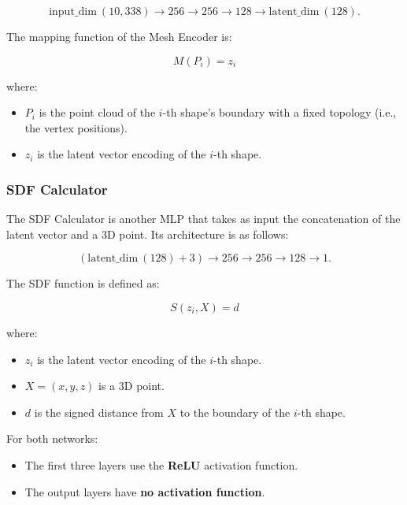 \documentclass[a4paper,12pt]{article}
\begin{document}
\[
	\text{input\_dim} \ (10,338) \rightarrow 256 \rightarrow 256 \rightarrow 128 \rightarrow \text{latent\_dim} \ (128).
\]

The mapping function of the Mesh Encoder is:

\[
	M(P_i) = z_i
\]

where:
\begin{itemize}
	\item \( P_i \) is the point cloud of the \( i \)-th shape's boundary with a fixed topology (i.e., the vertex positions).
	\item \( z_i \) is the latent vector encoding of the \( i \)-th shape.
\end{itemize}

\subsubsection*{SDF Calculator}
The SDF Calculator is another MLP that takes as input the concatenation of the latent vector and a 3D point. Its architecture is as follows:

\[
	(\text{latent\_dim} \ (128) + 3) \rightarrow 256 \rightarrow 256 \rightarrow 128 \rightarrow 1.
\]

The SDF function is defined as:

\[
	S(z_i, X) = d
\]

where:
\begin{itemize}
	\item \( z_i \) is the latent vector encoding of the \( i \)-th shape.
	\item \( X = (x, y, z) \) is a 3D point.
	\item \( d \) is the signed distance from \( X \) to the boundary of the \( i \)-th shape.
\end{itemize}

For both networks:
\begin{itemize}
	\item The first three layers use the \textbf{ReLU} activation function.
	\item The output layers have \textbf{no activation function}.
\end{itemize}
\end{document}
